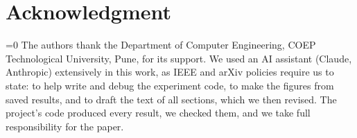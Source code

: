 \documentclass[conference]{IEEEtran}
\providecommand{\anonymous}{1}
\begin{document}
\section*{Acknowledgment}
\ifnum\anonymous=0
The authors thank the Department of Computer Engineering, COEP Technological University, Pune, for its support.
\fi
We used an AI assistant (Claude, Anthropic) extensively in this work, as IEEE and arXiv policies require us to state: to help write and debug the experiment code, to make the figures from saved results, and to draft the text of all sections, which we then revised. The project's code produced every result, we checked them, and we take full responsibility for the paper.



\end{document}
